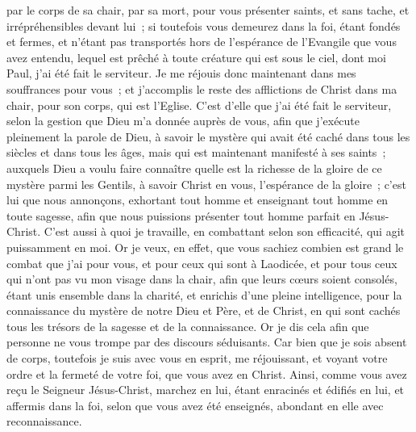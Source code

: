 \begin{multicols}{2}
par le corps de sa chair, par sa mort, pour vous présenter saints, et sans tache, et irrépréhensibles devant lui~;
si toutefois vous demeurez dans la foi, étant fondés et fermes, et n'étant pas transportés hors de l'espérance de l'Evangile que vous avez entendu, lequel est prêché à toute créature qui est sous le ciel, dont moi Paul, j'ai été fait le serviteur.
Je me réjouis donc maintenant dans mes souffrances pour vous~; et j'accomplis le reste des afflictions de Christ dans ma chair, pour son corps, qui est l'Eglise.
C'est d'elle que j'ai été fait le serviteur, selon la gestion que Dieu m'a donnée auprès de vous, afin que j'exécute pleinement la parole de Dieu,
à savoir le mystère qui avait été caché dans tous les siècles et dans tous les âges, mais qui est maintenant manifesté à ses saints~;
auxquels Dieu a voulu faire connaître quelle est la richesse de la gloire de ce mystère parmi les Gentils, à savoir Christ en vous, l'espérance de la gloire~; 
c'est lui que nous annonçons, exhortant tout homme et enseignant tout homme en toute sagesse, afin que nous puissions présenter tout homme parfait en Jésus-Christ.
C'est aussi à quoi je travaille, en combattant selon son efficacité, qui agit puissamment en moi.
\VerseOne{}Or je veux, en effet, que vous sachiez combien est grand le combat que j'ai pour vous, et pour ceux qui sont à Laodicée, et pour tous ceux qui n'ont pas vu mon visage dans la chair,
afin que leurs cœurs soient consolés, étant unis ensemble dans la charité, et enrichis d'une pleine intelligence, pour la connaissance du mystère de notre Dieu et Père, et de Christ,
en qui sont cachés tous les trésors de la sagesse et de la connaissance.
Or je dis cela afin que personne ne vous trompe par des discours séduisants.
Car bien que je sois absent de corps, toutefois je suis avec vous en esprit, me réjouissant, et voyant votre ordre et la fermeté de votre foi, que vous avez en Christ.
Ainsi, comme vous avez reçu le Seigneur Jésus-Christ, marchez en lui,
étant enracinés et édifiés en lui, et affermis dans la foi, selon que vous avez été enseignés, abondant en elle avec reconnaissance.

\end{multicols}
